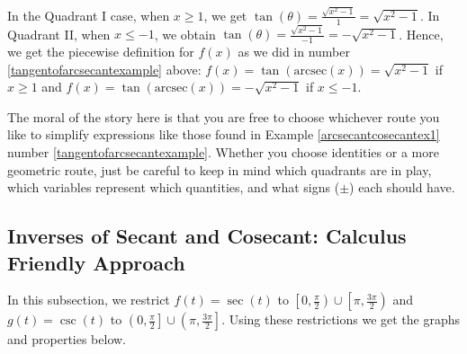\documentclass{ximera}
\begin{document}
\smallskip

In the Quadrant I case, when $x \geq 1$, we get $\tan(\theta)  = \frac{\sqrt{x^2-1}}{1} = \sqrt{x^2-1}$.  In Quadrant II, when $x \leq -1$, we obtain  $\tan(\theta)  = \frac{\sqrt{x^2-1}}{-1} = - \sqrt{x^2-1}$.   Hence, we get the piecewise definition for $f(x)$ as we did in number \ref{tangentofarcsecantexample} above:  $f(x)  = \tan(\mbox{arcsec}(x)) = \sqrt{x^2-1}$ if $x \geq 1$ and $f(x)  = \tan(\mbox{arcsec}(x)) = -\sqrt{x^2-1}$ if $x \leq -1$.

\smallskip

The moral of the story here is that you are free to choose whichever route you like to simplify expressions like those found in Example \ref{arcsecantcosecantex1} number \ref{tangentofarcsecantexample}.  Whether you choose identities or a more geometric route, just be careful to keep in mind which quadrants are in play, which variables represent which quantities, and what signs ($\pm$) each should have.


\subsection{Inverses of Secant and Cosecant: Calculus Friendly Approach}
\label{arcsecantcalcfriendly}

In this subsection, we restrict $f(t) = \sec(t)$ to $\left[0, \frac{\pi}{2}\right) \cup \left[\pi, \frac{3\pi}{2}\right)$  and  $g(t) = \csc(t)$ to $\left(0, \frac{\pi}{2}\right] \cup \left( \pi, \frac{3\pi}{2}\right]$.  Using these restrictions we get the graphs and properties below.
\end{document}
